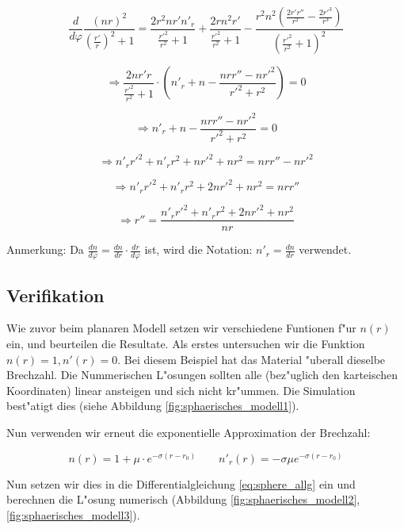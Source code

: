 \begin{refsection}
$$\frac{d}{d\varphi}\frac{(n r)^2}{\left(\frac{r'}{r}\right)^2 + 1} =  \frac{2 r^2 n r' n'_r}{\frac{r'^2}{r^2}+1}+\frac{2 r n^2 r'}{\frac{r'^2}{r^2}+1}-\frac{r^2 n^2 \left(\frac{2 r' r''}{r^2}-\frac{2 r'^3}{r^3}\right)}{\left(\frac{r'^2}{r^2}+1\right)^2}$$

$$\Rightarrow \frac{2n r' r}{\frac{r'^2}{r^2}+1} \cdot \left( n'_r + n - \frac{n r r'' - n r'^2}{r'^2 + r^2} \right) = 0$$

\begin{equation} \label{eq:sphere_origin}
\Rightarrow n'_r + n - \frac{n r r'' - n r'^2}{r'^2 + r^2} = 0
\end{equation}

$$\Rightarrow n'_r r'^2  + n'_r r^2 + n r'^2 + nr^2 = n r r'' - n r'^2$$

$$\Rightarrow n'_r r'^2 + n'_r r^2 + 2 n r'^2 + n r^2 = n r r''$$

\begin{equation} \label{eq:sphere_allg}
\Rightarrow r'' = \frac{n'_r r'^2 + n'_r r^2 + 2 n r'^2 + n r^2}{n r}
\end{equation}

Anmerkung: Da $\frac{dn}{d\varphi} = \frac{dn}{dr} \cdot \frac{dr}{d\varphi}$ ist, wird die Notation: $n'_r = \frac{dn}{dr}$ verwendet.

\subsection{Verifikation}
Wie zuvor beim planaren Modell setzen wir verschiedene Funtionen f"ur $n(r)$ ein, und beurteilen die Resultate. 
Als erstes untersuchen wir die Funktion $n(r) = 1, n'(r) = 0$. 
Bei diesem Beispiel hat das Material "uberall dieselbe Brechzahl.
Die Nummerischen L"osungen sollten alle (bez"uglich den karteischen Koordinaten) linear ansteigen und sich nicht kr"ummen. Die Simulation best"atigt dies (siehe Abbildung \ref{fig:sphaerisches_modell1}).

Nun verwenden wir erneut die exponentielle Approximation der Brechzahl: 

$$n(r) = 1 + \mu \cdot e^{-\sigma (r - r_0)} \qquad n'_r(r) = -\sigma \mu e^{-\sigma (r - r_0)}$$

Nun setzen wir dies in die Differentialgleichung \ref{eq:sphere_allg} ein und berechnen die L"osung numerisch (Abbildung \ref{fig:sphaerisches_modell2}, \ref{fig:sphaerisches_modell3}). 


\end{refsection}
